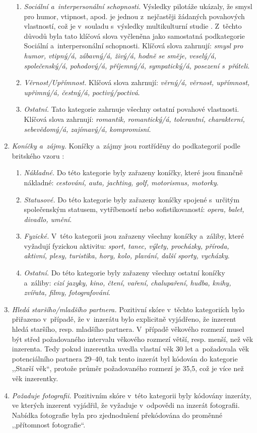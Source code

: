 \documentclass[a4paper, 12pt, notitlepage, oneside, numbers=noenddot]{report}
\begin{document}
\begin{enumerate}
\begin{enumerate}
\item \emph{Sociální a~interpersonální schopnosti.} Výsledky pilotáže
  ukázaly, že smysl pro humor, vtipnost, apod. je jednou z~nejčastěji
  žádaných povahových vlastností, což je v~souladu s~výsledky
  multikulturní studie \citep{BussEtAl1990}.  Z~těchto důvodů byla
  tato klíčová slova vyčleněna jako samostatná podkategorie Sociální
  a~interpersonální schopnosti. Klíčová slova zahrnují: \emph{smysl
    pro humor, vtipný/á, zábavný/á, živý/á, hodně se směje, veselý/á,
    společenský/á, pohodový/á, pří\-jemný/á, sympatický/á, posezení
    s~přáteli}.
\item \emph{Věrnost/Upřímnost.}  Klíčová slova zahrnují: \emph{věrný/á, věrnost,
  upřímnost, upřimný/á, čestný/á, poctivý/poctivá}.
\item \emph{Ostatní.} Tato kategorie zahrnuje všechny ostatní povahové
  vlastnosti. Klíčová slova zahrnují: \emph{romantik, romantický/á,
  tolerantní, charakterní, sebevědomý/á, zajímavý/á, kompromisní}.
\end{enumerate}
\item \emph{Koníčky a~zájmy.} Koníčky a~zájmy jsou roztříděny do podkategorií
  podle britského vzoru \citep{GreenlessMcGrew1994}:

\begin{enumerate}
\item \emph{Nákladné.} Do této kategorie byly zařazeny koníčky, které jsou
  finančně nákladné: \emph{cestování, auta, jachting, golf,
    motorismus, motorky}.
\item \emph{Statusové.} Do této kategorie byly zařazeny koníčky spojené
  s~určitým spole\-čen\-ským statusem, vytříbeností nebo sofistikovaností:
  \emph{opera, balet, divadlo, umění}.
\item \emph{Fyzické.} V~této kategorii jsou zařazeny všechny koníčky
  a~záliby, které vyžadují fyzickou aktivitu: \emph{sport, tanec,
    výlety, procházky, příroda, aktivní, plesy, turistika, hory, kolo,
    plavání, další sporty, vycházky}.
\item \emph{Ostatní.} Do této kategorie byly zařazeny všechny ostatní koníčky
  a~záliby: \emph{cizí jazyky, kino, čtení, vaření, chalupaření,
    hudba, knihy, zvířata, filmy, fotografování}.
\end{enumerate}
\item \emph{Hledá staršího/mladšího partnera.}  Pozitivní skóre v~těchto
  kategoriích bylo přiřazeno v~případě, že v~inzerátu bylo explicitně
  vyjádřeno, že inzerent hledá staršího, resp. mladšího partnera.
  V~případě věkového rozmezí musel být střed požadovaného intervalu
  věkového rozmezí větší, resp. menší, než věk inzerenta.  Tedy pokud
  inzerentka uvedla vlastní věk 30 let a~požadovala věk
  potenciálního partnera 29--40, tak tento inzerát byl kódován do
  kategorie ,,Starší věk``, protože průměr požadovaného rozmezí je
  35,5, což je více než věk inzerentky.
\item \emph{Požaduje fotografii.} Pozitivním skóre v~této kategorii byly
  kódovány inzeráty, ve kterých inzerent vyjádřil, že vyžaduje
  v~odpovědi na inzerát fotografii.  Nabídka fotografie byla pro
  zjednodušení překódována do proměnné ,,přítomnost fotografie``.
\end{enumerate}
\end{document}
